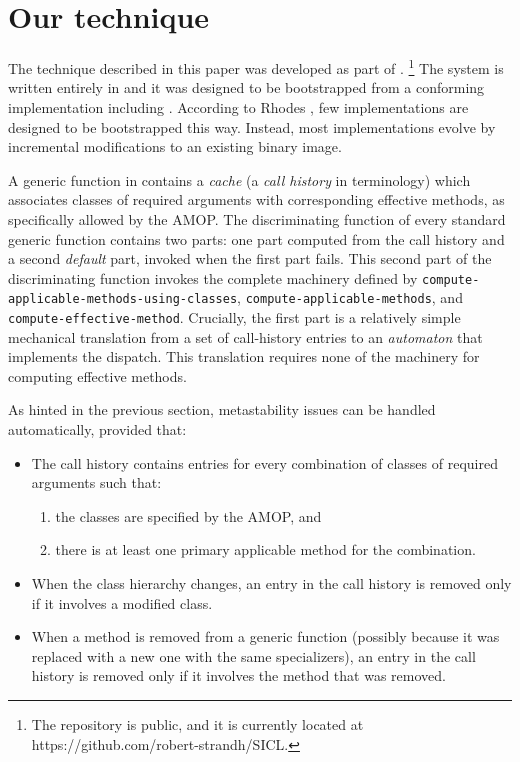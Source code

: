 \section{Our technique}

The technique described in this paper was developed as part of
\sicl{}.%
\footnote{The \sicl{} repository is public, and it is currently
  located at https://github.com/robert-strandh/SICL.}  The system is
written entirely in \cl{} and it was designed to be bootstrapped 
from a conforming \cl{} implementation including \clos{}.  
According to Rhodes \cite{Rhodes:2008:SSC:1482373.1482380}, few \cl{}
implementations are designed to be bootstrapped this way.  Instead,
most implementations evolve by incremental modifications to an
existing binary image.

A generic function in \sicl{} contains a \emph{cache} (a \emph{call
  history} in \sicl{} terminology) which associates classes of
required arguments with corresponding effective methods, as
specifically allowed by the AMOP.  The discriminating function of
every standard generic function contains two parts: one part computed
from the call history and a second \emph{default} part, invoked when
the first part fails.  This second part of the discriminating function
invokes the complete machinery defined by
\texttt{compute-applicable-methods-using-classes},
\texttt{compute-applicable-methods}, and
\texttt{compute-effective-method}.  Crucially, the first part is a
relatively simple mechanical translation from a set of call-history
entries to an \emph{automaton} that implements the dispatch.  This
translation requires none of the machinery for computing effective
methods. 

As hinted in the previous section, metastability issues can be handled
automatically, provided that:

\begin{itemize}
\item The call history contains entries for every combination of
  classes of required arguments such that:
  \begin{enumerate}
  \item the classes are specified by the AMOP, and 
  \item there is at least one primary applicable method for the
    combination.
  \end{enumerate}
\item When the class hierarchy changes, an entry in the call history
  is removed only if it involves a modified class.
\item When a method is removed from a generic function (possibly
  because it was replaced with a new one with the same specializers),
  an entry in the call history is removed only if it involves the
  method that was removed.
\end{itemize}

